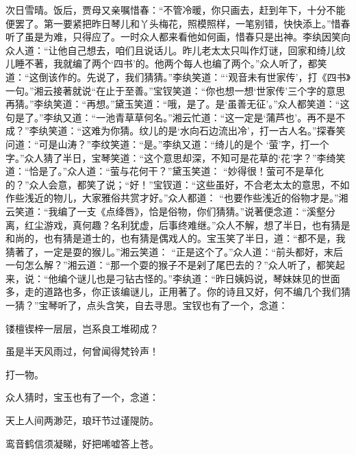 \begin{parag}
    次日雪晴。饭后，贾母又亲嘱惜春：“不管冷暖，你只画去，赶到年下，十分不能便罢了。第一要紧把昨日琴儿和丫头梅花，照模照样，一笔别错，快快添上。”惜春听了虽是为难，只得应了。一时众人都来看他如何画，惜春只是出神。李纨因笑向众人道：“让他自己想去，咱们且说话儿。昨儿老太太只叫作灯谜，回家和绮儿纹儿睡不著，我就编了两个‘四书’的。他两个每人也编了两个。”众人听了，都笑道：“这倒该作的。先说了，我们猜猜。”李纨笑道：“‘观音未有世家传’，打《四书》一句。”湘云接著就说“在止于至善。”宝钗笑道：“你也想一想‘世家传’三个字的意思再猜。”李纨笑道：“再想。”黛玉笑道：“哦，是了。是‘虽善无征’。”众人都笑道：“这句是了。”李纨又道：“一池青草草何名。”湘云忙道：“这一定是‘蒲芦也’。再不是不成？”李纨笑道：“这难为你猜。纹儿的是‘水向石边流出冷’，打一古人名。”探春笑问道：“可是山涛？”李纹笑道：“是。”李纨又道：“绮儿的是个 ‘萤’字，打一个字。”众人猜了半日，宝琴笑道：“这个意思却深，不知可是花草的‘花’字？”李绮笑道：“恰是了。”众人道：“萤与花何干？”黛玉笑道： “妙得很！萤可不是草化的？”众人会意，都笑了说；“好！”宝钗道：“这些虽好，不合老太太的意思，不如作些浅近的物儿，大家雅俗共赏才好。”众人都道： “也要作些浅近的俗物才是。”湘云笑道：“我编了一支《点绛唇》，恰是俗物，你们猜猜。”说著便念道：“溪壑分离，红尘游戏，真何趣？名利犹虚，后事终难继。”众人不解，想了半日，也有猜是和尚的，也有猜是道士的，也有猜是偶戏人的。宝玉笑了半日，道：“都不是，我猜著了，一定是耍的猴儿。”湘云笑道： “正是这个了。”众人道：“前头都好，末后一句怎么解？”湘云道：“那一个耍的猴子不是剁了尾巴去的？”众人听了，都笑起来，说：“他编个谜儿也是刁钻古怪的。”李纨道：“昨日姨妈说，琴妹妹见的世面多，走的道路也多，你正该编谜儿，正用著了。你的诗且又好，何不编几个我们猜一猜？”宝琴听了，点头含笑，自去寻思。宝钗也有了一个，念道：
\end{parag}
\begin{poem}

    \begin{pl}

        镂檀锲梓一层层，岂系良工堆砌成？
    \end{pl}
    \begin{pl}

        虽是半天风雨过，何曾闻得梵铃声！
    \end{pl}

\end{poem}


\begin{parag}
    打一物。
\end{parag}


\begin{parag}
    众人猜时，宝玉也有了一个，念道：
\end{parag}
\begin{poem}

    \begin{pl}

        天上人间两渺茫，琅玕节过谨隄防。
    \end{pl}
    \begin{pl}

        鸾音鹤信须凝睇，好把唏嘘答上苍。
    \end{pl}

\end{poem}



